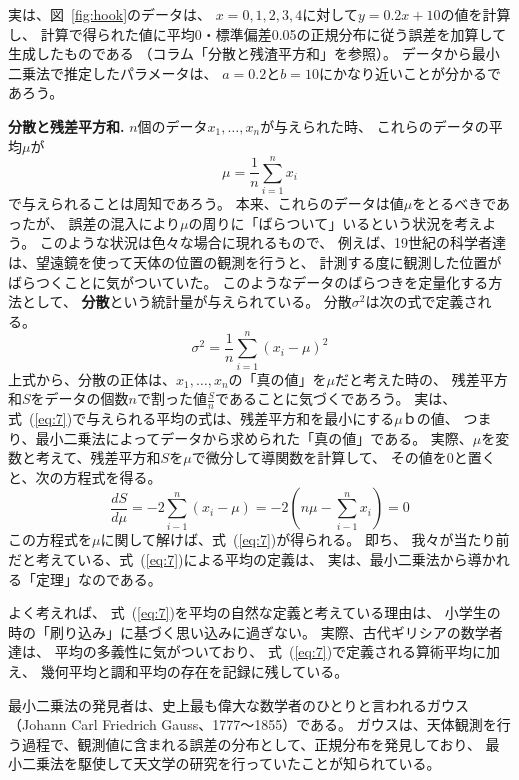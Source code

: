 実は、図~\ref{fig:hook}のデータは、
$x = 0, 1, 2, 3, 4$に対して$y = 0.2x + 10$の値を計算し、
計算で得られた値に平均0・標準偏差0.05の正規分布に従う誤差を加算して生成したものである
（コラム「分散と残渣平方和」を参照）。
データから最小二乗法で推定したパラメータは、
$a = 0.2$と$b = 10$にかなり近いことが分かるであろう。

\newpage
\begin{itembox}{\bf 分散と残差平方和.}
  $n$個のデータ$x_1, \dots, x_n$が与えられた時、
  これらのデータの平均$\mu$が
  \begin{equation}\label{eq:7}
    \mu = \frac 1n\sum_{i=1}^n x_i
  \end{equation}
  で与えられることは周知であろう。
  本来、これらのデータは値$\mu$をとるべきであったが、
  誤差の混入により$\mu$の周りに「ばらついて」いるという状況を考えよう。
  このような状況は色々な場合に現れるもので、
  例えば、19世紀の科学者達は、望遠鏡を使って天体の位置の観測を行うと、
  計測する度に観測した位置がばらつくことに気がついていた。
  このようなデータのばらつきを定量化する方法として、
  \textbf{分散}という統計量が与えられている。
  分散$\sigma^2$は次の式で定義される。
  \[
    \sigma^2 = \frac 1n\sum_{i=1}^n (x_i - \mu)^2
  \]
  上式から、分散の正体は、$x_1, \dots, x_n$の「真の値」を$\mu$だと考えた時の、
  残差平方和$S$をデータの個数$n$で割った値$\frac Sn$であることに気づくであろう。
  実は、式~(\ref{eq:7})で与えられる平均の式は、残差平方和を最小にする$\mu$ｂの値、
  つまり、最小二乗法によってデータから求められた「真の値」である。
  実際、$\mu$を変数と考えて、残差平方和$S$を$\mu$で微分して導関数を計算して、
  その値を0と置くと、次の方程式を得る。
  \[
    \frac{dS}{d\mu} =
    -2 \sum_{i-1}^n (x_i - \mu) = 
    -2 \left( n\mu - \sum_{i-1}^n x_i\right) = 0
  \]
  この方程式を$\mu$に関して解けば、式~(\ref{eq:7})が得られる。
  即ち、
  我々が当たり前だと考えている、式~(\ref{eq:7})による平均の定義は、
  実は、最小二乗法から導かれる「定理」なのである。

  よく考えれば、
  式~(\ref{eq:7})を平均の自然な定義と考えている理由は、
  小学生の時の「刷り込み」に基づく思い込みに過ぎない。
  実際、古代ギリシアの数学者達は、
  平均の多義性に気がついており、
  式~(\ref{eq:7})で定義される算術平均に加え、
  幾何平均と調和平均の存在を記録に残している。

  最小二乗法の発見者は、史上最も偉大な数学者のひとりと言われるガウス
  （Johann Carl Friedrich Gauss、1777〜1855）である。
  ガウスは、天体観測を行う過程で、観測値に含まれる誤差の分布として、正規分布を発見しており、
  最小二乗法を駆使して天文学の研究を行っていたことが知られている。  
\end{itembox}

